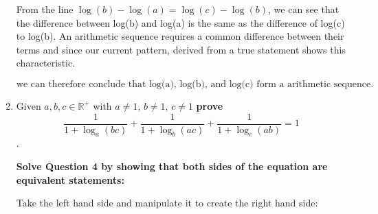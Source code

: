 \documentclass[12pt]{book}
\begin{document}
\begin{enumerate}
\newpage

From the line $\log(b) - \log(a) = \log(c) - \log(b)$, we can 
see that the difference between log(b) and log(a) is the same 
as the difference of log(c) to log(b). An arithmetic sequence 
requires a common difference between their terms and since our 
current pattern, derived from a true statement shows this 
characteristic.

$$\boxed{\text{we can therefore conclude that } \text{log(a), log(b), and log(c) form a arithmetic sequence.}}$$

\newpage


\item Given $a,b,c \in \mathbb{R^+}$ with $a\neq1$, $b\neq1$, $c\neq1$ \textbf{prove} $$\dfrac{1}{1+\log_a(bc)} + \dfrac{1}{1+\log_b(ac)} + \dfrac{1}{1+\log_c(ab)} = 1$$.

\vspace{0.5cm}
\textbf{Solve Question 4 by showing that both sides of the equation are equivalent statements:}

\vspace{0.2cm}
Take the left hand side and manipulate it to create the right hand side:


\end{enumerate}
\end{document}
